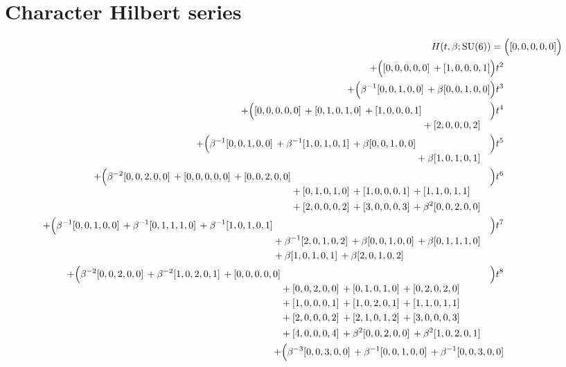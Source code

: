 \documentclass[10pt]{article}
\begin{document}
\section{Character Hilbert series}
\[
\begin{aligned}
H(t,\beta;\mathrm{SU}(6)) ={}&
   \Bigl([0,0,0,0,0]\Bigr) \\
  + \Bigl([0,0,0,0,0]\,+[1,0,0,0,1]\Bigr)t^{2} \\
  + \Bigl(\beta^{-1}[0,0,1,0,0]\,+\beta[0,0,1,0,0]\Bigr)t^{3} \\
  + \Bigl(\begin{aligned}[t][0,0,0,0,0]\,+[0,1,0,1,0]\,+[1,0,0,0,1] \\
  &{}+[2,0,0,0,2]\end{aligned}\Bigr)t^{4} \\
  + \Bigl(\begin{aligned}[t]\beta^{-1}[0,0,1,0,0]\,+\beta^{-1}[1,0,1,0,1]\,+\beta[0,0,1,0,0] \\
  &{}+\beta[1,0,1,0,1]\end{aligned}\Bigr)t^{5} \\
  + \Bigl(\begin{aligned}[t]\beta^{-2}[0,0,2,0,0]\,+[0,0,0,0,0]\,+[0,0,2,0,0] \\
  &{}+[0,1,0,1,0]\,+[1,0,0,0,1]\,+[1,1,0,1,1] \\
  &{}+[2,0,0,0,2]\,+[3,0,0,0,3]\,+\beta^{2}[0,0,2,0,0]\end{aligned}\Bigr)t^{6} \\
  + \Bigl(\begin{aligned}[t]\beta^{-1}[0,0,1,0,0]\,+\beta^{-1}[0,1,1,1,0]\,+\beta^{-1}[1,0,1,0,1] \\
  &{}+\beta^{-1}[2,0,1,0,2]\,+\beta[0,0,1,0,0]\,+\beta[0,1,1,1,0] \\
  &{}+\beta[1,0,1,0,1]\,+\beta[2,0,1,0,2]\end{aligned}\Bigr)t^{7} \\
  + \Bigl(\begin{aligned}[t]\beta^{-2}[0,0,2,0,0]\,+\beta^{-2}[1,0,2,0,1]\,+[0,0,0,0,0] \\
  &{}+[0,0,2,0,0]\,+[0,1,0,1,0]\,+[0,2,0,2,0] \\
  &{}+[1,0,0,0,1]\,+[1,0,2,0,1]\,+[1,1,0,1,1] \\
  &{}+[2,0,0,0,2]\,+[2,1,0,1,2]\,+[3,0,0,0,3] \\
  &{}+[4,0,0,0,4]\,+\beta^{2}[0,0,2,0,0]\,+\beta^{2}[1,0,2,0,1]\end{aligned}\Bigr)t^{8} \\
  + \Bigl(\begin{aligned}[t]\beta^{-3}[0,0,3,0,0]\,+\beta^{-1}[0,0,1,0,0]\,+\beta^{-1}[0,0,3,0,0] \\

\end{aligned}
\end{aligned}\]
\end{document}
